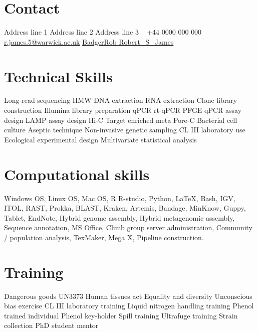 \documentclass[hidelinks]{james-cv} %
\begin{document}


\begin{aside} 
\section{Contact}
Address line 1
Address line 2
Address line 3
~
\color{black}\bodyfontcontact +$44$ $0000$ $000$ $000$ \Mobilefone
\color{blue}\href{mailto:r.james.5@warwick.ac.uk}{r.james.5@warwick.ac.uk} \color{black}\Envelope
\color{blue}\href{https://github.com/BadgerRob}{BadgerRob } \color{black}\faGithub
\color{blue}\href{http://twitter.com/Robert_S_James}{Robert\_S\_James} \color{black}\faTwitter
\headingfont\section{Technical Skills}
\thinfont\footnotesize{} Long-read sequencing \textbullet{}
HMW DNA extraction \textbullet{}
RNA extraction \textbullet{}
Clone library construction \textbullet{}
Illumina library preparation \textbullet{}
qPCR \textbullet{}
rt-qPCR \textbullet{}
PFGE \textbullet{}
qPCR assay design \textbullet{}
LAMP assay design \textbullet{}
Hi-C \textbullet{}
Target enriched meta Pore-C \textbullet{}
Bacterial cell culture \textbullet{}
Aseptic technique \textbullet{}
Non-invasive genetic sampling \textbullet{}
CL III laboratory use \textbullet{}
Ecological experimental design \textbullet{}
Multivariate statistical analysis \textbullet{}
\headingfont\section{Computational skills}
\emergencystretch=5pt\justify\thinfont\footnotesize\nolinebreak{}Windows OS, Linux OS, Mac OS, R R-studio, Python, \LaTeX, Bash, IGV, ITOL, RAST, Prokka, BLAST, Kraken, Artemis, Bandage, MinKnow, Guppy, Tablet, EndNote, Hybrid genome assembly, Hybrid metagenomic assembly, Sequence annotation, MS Office, Climb group server administration, Community / population analysis, TexMaker, Mega X, Pipeline construction.\headingfont\flushright\section{Training}

\flushright\thinfont\footnotesize{} 
Dangerous goods UN3373 \textbullet{}
Human tissues act \textbullet{}
Equality and diversity \textbullet{}
Unconscious bias exercise \textbullet{}
CL III laboratory training \textbullet{}
Liquid nitrogen handling training \textbullet{}
Phenol trained individual \textbullet{}
Phenol key-holder \textbullet{}
Spill training \textbullet{}
Ultrafuge training \textbullet{}
Strain collection \textbullet{}
PhD student mentor \textbullet{}
\end{aside}
\end{document}
